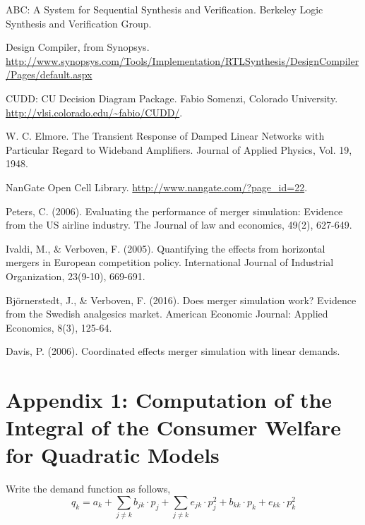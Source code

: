\documentclass[12pt]{article}
\begin{document}
\newpage
\begin{thebibliography}{9}

ABC: A System for Sequential Synthesis and Verification. Berkeley Logic Synthesis and Verification Group.
 
Design Compiler, from Synopsys. \url{http://www.synopsys.com/Tools/Implementation/RTLSynthesis/DesignCompiler/Pages/default.aspx}

CUDD: CU Decision Diagram Package. Fabio Somenzi, Colorado University. \url{http://vlsi.colorado.edu/~fabio/CUDD/}.

W. C. Elmore. The Transient Response of Damped Linear Networks with Particular Regard to Wideband Amplifiers. Journal of Applied Physics, Vol. 19, 1948.

NanGate Open Cell Library. \url{http://www.nangate.com/?page_id=22}.

Peters, C. (2006). Evaluating the performance of merger simulation: Evidence from the US airline industry. The Journal of law and economics, 49(2), 627-649.

Ivaldi, M., \& Verboven, F. (2005). Quantifying the effects from horizontal mergers in European competition policy. International Journal of Industrial Organization, 23(9-10), 669-691.

Bj\"{o}rnerstedt, J., \& Verboven, F. (2016). Does merger simulation work? Evidence from the Swedish analgesics market. American Economic Journal: Applied Economics, 8(3), 125-64.

Davis, P. (2006). Coordinated effects merger simulation with linear demands.
\end{thebibliography}


\newpage
\listoffigures

\newpage
\listoftables

\newpage
\section{Appendix 1: Computation of the Integral of the Consumer Welfare for Quadratic Models}

Write the demand function as follows,
\begin{equation} \label{demand}
q_k = a_k + \sum_{j \neq k} b_{jk} \cdot p_j + \sum_{j \neq k} e_{jk} \cdot p_j^2 + b_{kk} \cdot p_k + e_{kk} \cdot p_k^2
\end{equation}
\end{document}
